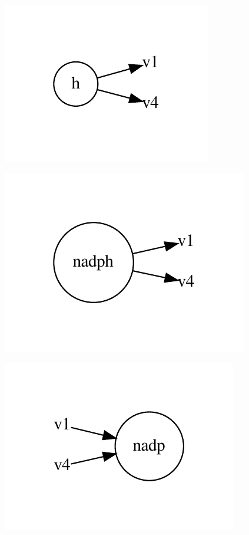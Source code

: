 \documentclass{scrartcl}
\begin{document}
\begin{minipage}{0.33\linewidth}
\includegraphics[max width=\linewidth]{metabolic_maps/h.pdf}
\end{minipage}
\begin{minipage}{0.33\linewidth}
\includegraphics[max width=\linewidth]{metabolic_maps/nadph.pdf}
\end{minipage}
\begin{minipage}{0.33\linewidth}
\includegraphics[max width=\linewidth]{metabolic_maps/nadp.pdf}
\end{minipage}
\end{document}

